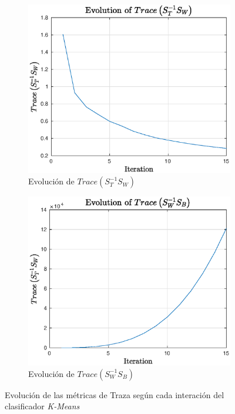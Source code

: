 \documentclass[11pt]{article} %
\begin{document}
\begin{figure}[h]
    \centering
    \begin{subfigure}[b]{0.435\textwidth}
        \includegraphics[width=\textwidth]{../src/fig/22_trace1.eps}
        \caption[]{Evolución de $Trace \left( S_T^{-1} S_W \right)$}
        \label{fig:22:trace:1}
    \end{subfigure}
    \quad
    \begin{subfigure}[b]{0.435\textwidth}
        \includegraphics[width=\textwidth]{../src/fig/22_trace2.eps}
        \caption[]{Evolución de $Trace \left( S_W^{-1} S_B \right)$}
        \label{fig:22:trace:2}
    \end{subfigure}
    \caption{Evolución de las métricas de Traza según cada interación del
    clasificador \emph{K-Means}}
    \label{fig:22:traces}
\end{figure}
\end{document}
